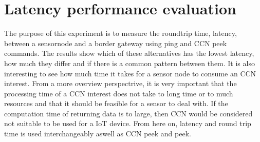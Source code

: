 
\section{Latency performance evaluation}
The purpose of this experiment is to measure the roundtrip time, latency, between a sensornode and a border gateway using ping and CCN peek commands. The results show which of these alternatives has the lowest latency, how much they differ and if there is a common pattern between them. It is also interesting to see how much time it takes for a sensor node to consume an CCN interest. From a more overview perspectrive, it is very important that the processing time of a CCN interest does not take to long time or to much resources and that it should be feasible for a sensor to deal with. If the computation time of returning data is to large, then CCN would be considered not suitable to be used for a IoT device. From here on, latency and round trip time is used interchangeably aswell as CCN peek and peek.





